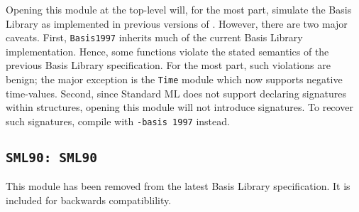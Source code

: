 
Opening this module at the top-level will, for the most part, simulate
the Basis Library as implemented in previous versions of {\mlton}.
However, there are two major caveats.  First, {\tt Basis1997} inherits
much of the current Basis Library implementation.  Hence, some
functions violate the stated semantics of the previous Basis Library
specification.  For the most part, such violations are benign; the
major exception is the {\tt Time} module which now supports negative
time-values.  Second, since Standard ML does not support declaring
signatures within structures, opening this module will not introduce
signatures.  To recover such signatures, compile with {\tt -basis
1997} instead.

\subsection{{\tt SML90: SML90}}

This module has been removed from the latest Basis Library
specification.  It is included for backwards compatiblility.

